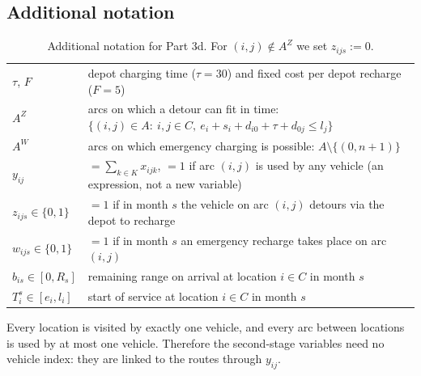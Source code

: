 \documentclass[11pt,a4paper]{article}
\theoremstyle{definition}
\newcommand{\sumk}{\sum_{k\in K}}
\begin{document}
\subsection{Additional notation}
\begin{table}[H]
\centering\small
\renewcommand{\arraystretch}{1.15}
\begin{tabularx}{\textwidth}{@{}l X@{}}
\toprule
$\tau$, $F$ & depot charging time ($\tau=30$) and fixed cost per depot recharge ($F=5$)\\
$A^Z$ & arcs on which a detour can fit in time: $\{(i,j)\in A:\ i,j\in C,\ e_i+s_i+d_{i0}+\tau+d_{0j}\le l_j\}$\\
$A^W$ & arcs on which emergency charging is possible: $A\setminus\{(0,n+1)\}$\\
$y_{ij}$ & $=\sumk x_{ijk}$, $=1$ if arc $(i,j)$ is used by any vehicle (an expression, not a new variable)\\
\midrule
$z_{ijs}\in\{0,1\}$ & $=1$ if in month $s$ the vehicle on arc $(i,j)$ detours via the depot to recharge\\
$w_{ijs}\in\{0,1\}$ & $=1$ if in month $s$ an emergency recharge takes place on arc $(i,j)$\\
$b_{is}\in[0,R_s]$ & remaining range on arrival at location $i\in C$ in month $s$\\
$T^s_i\in[e_i,l_i]$ & start of service at location $i\in C$ in month $s$\\
\bottomrule
\end{tabularx}
\caption{Additional notation for Part 3d. For $(i,j)\notin A^Z$ we set $z_{ijs}:=0$.}
\end{table}
Every location is visited by exactly one vehicle, and every arc between locations is used by at most one vehicle. Therefore the second-stage variables need no vehicle index: they are linked to the routes through $y_{ij}$.
\end{document}
